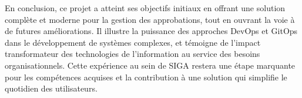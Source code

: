 En conclusion, ce projet a atteint ses objectifs initiaux en offrant une solution complète et moderne pour la gestion des approbations, tout en ouvrant la voie à de futures améliorations. Il illustre la puissance des approches DevOps et GitOps dans le développement de systèmes complexes, et témoigne de l’impact transformateur des technologies de l’information au service des besoins organisationnels. Cette expérience au sein de SIGA restera une étape marquante pour les compétences acquises et la contribution à une solution qui simplifie le quotidien des utilisateurs.
